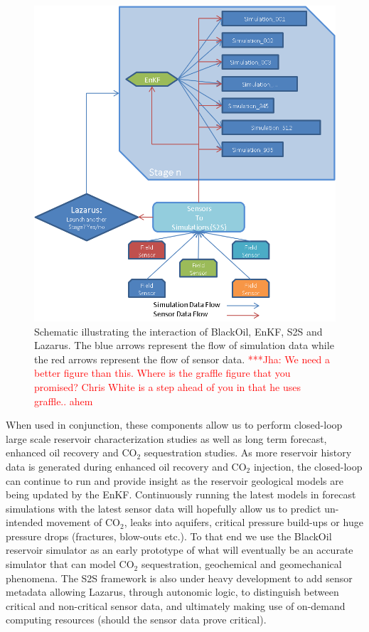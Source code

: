 \documentclass{rspublic}
\newcommand{\jhanote}[1]{ {\textcolor{red} { ***Jha: #1 }}}
\newcommand{\jhanote}[1]{}
\begin{document}
\begin{figure}
\begin{center}
\includegraphics*[scale=0.7,angle=0]{figures/Picture2.png}
\end{center}
\caption{Schematic illustrating the interaction of BlackOil, EnKF, S2S
  and Lazarus. The blue arrows represent the flow of simulation data
  while the red arrows represent the flow of sensor data. \jhanote{We
    need a better figure than this. Where is the graffle figure that
    you promised? Chris White is a step ahead of you in that he uses
    graffle.. ahem}}
\label{fig:irregular_execution}
\end{figure}


When used in conjunction, these components allow us to perform closed-loop large scale 
reservoir characterization studies as well as long term forecast, enhanced oil recovery 
and CO$_2$ sequestration studies. As more reservoir history data is generated during 
enhanced oil recovery and CO$_2$ injection, the closed-loop can continue to run and 
provide insight as the reservoir geological models are being updated by the EnKF. 
Continuously running the latest models in forecast simulations with the 
latest sensor data will hopefully allow us to predict un-intended movement of CO$_2$, 
leaks into aquifers, critical pressure build-ups or huge pressure drops (fractures, 
blow-outs etc.). To that end we use the BlackOil reservoir simulator as an early prototype 
of what will eventually be an accurate simulator that can model CO$_2$ sequestration, 
geochemical and geomechanical phenomena. The S2S framework is also under heavy development 
to add sensor metadata allowing Lazarus, through autonomic logic, to distinguish between 
critical and non-critical sensor data, and ultimately making use of on-demand computing 
resources (should the sensor data prove critical).
\end{document}
